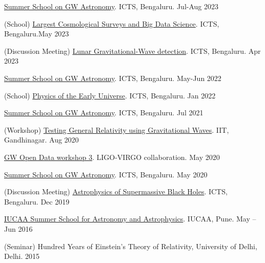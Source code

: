 \begin{itemize}[noitemsep]
{
\item \href{https://www.icts.res.in/program/gws2023}{Summer School on GW Astronomy}. ICTS, Bengaluru. \hfill{Jul-Aug 2023}
\item (School) \href{https://icts.res.in/program/BigDataCosmo}{Largest Cosmological Surveys and Big Data Science}. ICTS, Bengaluru.\hfill{May 2023}
\item (Discussion Meeting) \href{https://www.icts.res.in/discussion-meeting/LGWD}{Lunar Gravitational-Wave detection}. ICTS, Bengaluru. \hfill{Apr 2023}
\item \href{https://www.icts.res.in/program/gws2022}{Summer School on GW Astronomy}. ICTS, Bengaluru. \hfill{May-Jun 2022}
\item (School) \href{https://www.icts.res.in/program/peu2022}{Physics of the Early Universe}. ICTS, Bengaluru. \hfill{Jan 2022} 
\item \href{https://www.icts.res.in/program/gws2021}{Summer School on GW Astronomy}. ICTS, Bengaluru. \hfill{Jul 2021}
\item (Workshop) \href{https://events.iitgn.ac.in/2020/TGRGW/}{Testing General Relativity using Gravitational Waves}. IIT, Gandhinagar. \hfill{Aug 2020}
\item \href{https://www.gw-openscience.org/static/workshop3/}{GW Open Data workshop 3}. LIGO-VIRGO collaboration. \hfill{May 2020}
\item \href{https://www.icts.res.in/program/gws2020}{Summer School on GW Astronomy}. ICTS, Bengaluru. \hfill{May 2020}
\item (Discussion Meeting) \href{https://www.icts.res.in/discussion-meeting/smbh2019}{Astrophysics of Supermassive Black Holes}. ICTS, Bengaluru. \hfill{Dec 2019}
\item \href{https://www-apps.iucaa.in/Stu-Prog-ISSIA.html}{IUCAA Summer School for Astronomy and Astrophysics}. IUCAA, Pune. \hfill{May -- Jun 2016}
\item (Seminar) Hundred Years of Einstein's Theory of Relativity, University of Delhi, Delhi. \hfill{2015}
}\end{itemize}